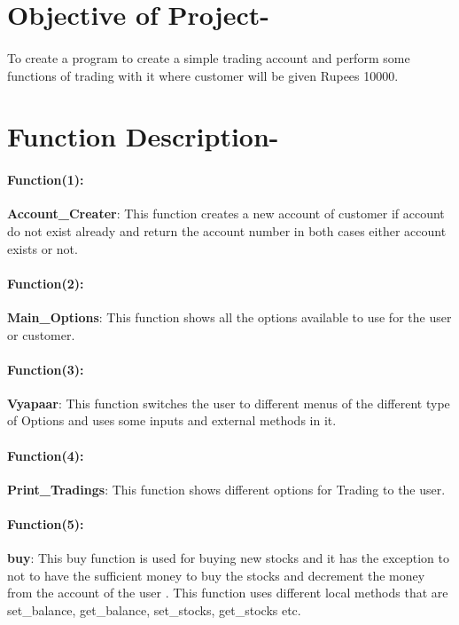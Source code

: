\documentclass[]{article}
\title{}
\author{}
\date{}
\begin{document}
\vspace*{1mm}

\section{Objective of Project-}

\paragraph{}\large To create a program to create a simple trading account and perform some functions of trading with it where customer will be given Rupees 10000.

\vspace*{1mm}

\section{Function Description-}

\paragraph{Function(1):}\textbf{Account\_Creater}:  This function creates a new account of customer if account do not exist already and return the account number in both cases either account exists or not.		
														
\paragraph{Function(2):}\textbf{Main\_Options}:  This function shows all the options available to use for the user or customer. 
											
\paragraph{Function(3):}\textbf{Vyapaar}:  This function switches the user to different menus of the different type of Options and uses some inputs and external methods in it.			
				
\paragraph{Function(4): }\textbf{Print\_Tradings}:  This function shows different options for Trading to the user.

\paragraph{Function(5): }\textbf{buy}:  This buy function is used for buying new stocks and it has the exception to not to have the sufficient money to buy the stocks and decrement the money from the account of the user . This function uses different local methods that are set\_balance, get\_balance, set\_stocks, get\_stocks etc. 
\end{document}
